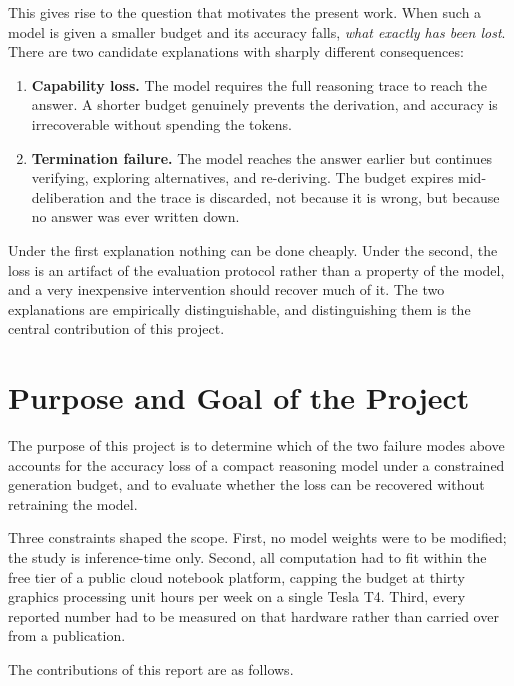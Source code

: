 \documentclass[12pt,a4paper,oneside]{report}
\begin{document}
This gives rise to the question that motivates the present work. When such a
model is given a smaller budget and its accuracy falls, \emph{what exactly has
been lost}. There are two candidate explanations with sharply different
consequences:

\begin{enumerate}
\item \textbf{Capability loss.} The model requires the full reasoning trace to
reach the answer. A shorter budget genuinely prevents the derivation, and
accuracy is irrecoverable without spending the tokens.
\item \textbf{Termination failure.} The model reaches the answer earlier but
continues verifying, exploring alternatives, and re-deriving. The budget expires
mid-deliberation and the trace is discarded, not because it is wrong, but
because no answer was ever written down.
\end{enumerate}

Under the first explanation nothing can be done cheaply. Under the second, the
loss is an artifact of the evaluation protocol rather than a property of the
model, and a very inexpensive intervention should recover much of it. The two
explanations are empirically distinguishable, and distinguishing them is the
central contribution of this project.

\section{Purpose and Goal of the Project}

The purpose of this project is to determine which of the two failure modes above
accounts for the accuracy loss of a compact reasoning model under a constrained
generation budget, and to evaluate whether the loss can be recovered without
retraining the model.

Three constraints shaped the scope. First, no model weights were to be modified;
the study is inference-time only. Second, all computation had to fit within the
free tier of a public cloud notebook platform, capping the budget at thirty
graphics processing unit hours per week on a single Tesla T4. Third, every
reported number had to be measured on that hardware rather than carried over
from a publication.

The contributions of this report are as follows.
\end{document}
